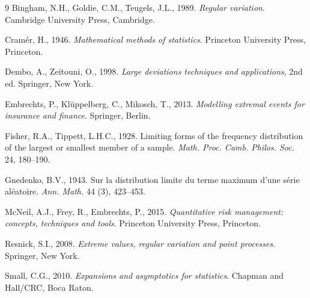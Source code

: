 \documentclass[11pt,reqno]{amsart}
\theoremstyle{definition}
\theoremstyle{remark}
\numberwithin{equation}{section}
\begin{document}
\begin{thebibliography}{9}
Bingham, N.H., Goldie, C.M., Teugels, J.L., 1989.
\emph{Regular variation}.
Cambridge University Press, Cambridge.

Cramér, H., 1946.
\emph{Mathematical methods of statistics}.
Princeton University Press, Princeton.

Dembo, A., Zeitouni, O., 1998.
\emph{Large deviations techniques and applications}, 2nd ed.
Springer, New York.


Embrechts, P., Klüppelberg, C., Mikosch, T., 2013.
\emph{Modelling extremal events for insurance and finance}.
Springer, Berlin.

Fisher, R.A., Tippett, L.H.C., 1928.
Limiting forms of the frequency distribution of the largest or smallest member of a sample.
\emph{Math. Proc. Camb. Philos. Soc.} 24, 180--190.



Gnedenko, B.V., 1943.
Sur la distribution limite du terme maximum d'une série aléatoire.
\emph{Ann. Math.} 44 (3), 423--453.

McNeil, A.J., Frey, R., Embrechts, P., 2015.
\emph{Quantitative risk management: concepts, techniques and tools}.
Princeton University Press, Princeton.


Resnick, S.I., 2008.
\emph{Extreme values, regular variation and point processes}.
Springer, New York.

Small, C.G., 2010.
\emph{Expansions and asymptotics for statistics}.
Chapman and Hall/CRC, Boca Raton.



\end{thebibliography}
\end{document}
